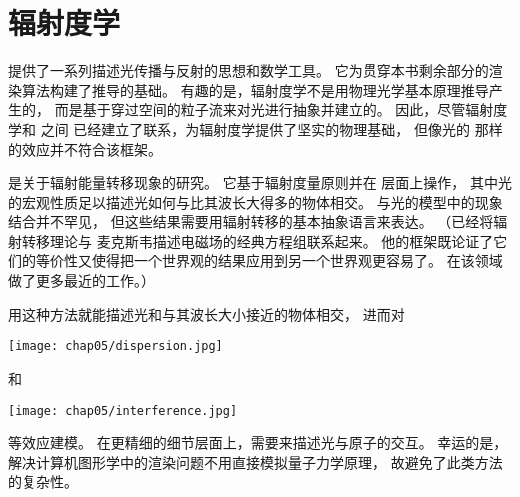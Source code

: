 \section{辐射度学}\label{sec:辐射度学}

提供了一系列描述光传播与反射的思想和数学工具。
它为贯穿本书剩余部分的渲染算法构建了推导的基础。
有趣的是，辐射度学不是用物理光学基本原理推导产生的，
而是基于穿过空间的粒子流来对光进行抽象并建立的。
因此，尽管辐射度学和
之间
已经建立了联系，为辐射度学提供了坚实的物理基础，
但像光的
那样的效应并不符合该框架。

是关于辐射能量转移现象的研究。
它基于辐射度量原则并在
层面上操作，
其中光的宏观性质足以描述光如何与比其波长大得多的物体相交。
与光的模型中的现象结合并不罕见，
但这些结果需要用辐射转移的基本抽象语言来表达。
（\citet{PREISENDORFER19653}已经将辐射转移理论与
麦克斯韦描述电磁场的经典方程组联系起来。
他的框架既论证了它们的等价性又使得把一个世界观的结果应用到另一个世界观更容易了。
\citet{Fante:81}在该领域做了更多最近的工作。）

用这种方法就能描述光和与其波长大小接近的物体相交，
进而对
\begin{marginfigure}
    \texttt{[image: chap05/dispersion.jpg]}
\end{marginfigure}
和
\begin{marginfigure}
    \texttt{[image: chap05/interference.jpg]}
\end{marginfigure}
等效应建模。
在更精细的细节层面上，需要来描述光与原子的交互。
幸运的是，解决计算机图形学中的渲染问题不用直接模拟量子力学原理，
故避免了此类方法的复杂性。


